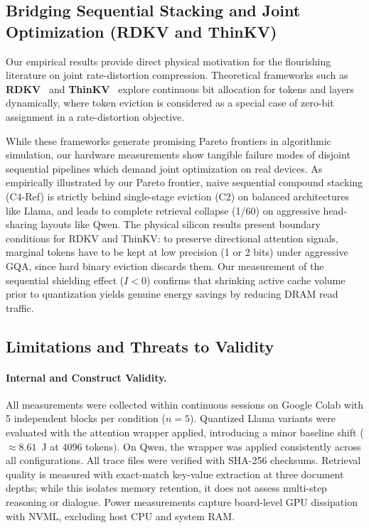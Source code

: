 \documentclass[sigconf,nonacm]{acmart}
\begin{document}
\subsection{Bridging Sequential Stacking and Joint Optimization (RDKV and ThinKV)}
\label{sec:joint-opt}
Our empirical results provide direct physical motivation for the flourishing literature on joint rate-distortion compression. Theoretical frameworks such as \textbf{RDKV}~\cite{zhang_rdkv_2026} and \textbf{ThinKV}~\cite{ramachandran_thinkv_2026} explore continuous bit allocation for tokens and layers dynamically, where token eviction is considered as a special case of zero-bit assignment in a rate-distortion objective.

While these frameworks generate promising Pareto frontiers in algorithmic simulation, our hardware measurements show tangible failure modes of disjoint sequential pipelines which demand joint optimization on real devices. As empirically illustrated by our Pareto frontier, naive sequential compound stacking (C4-Ref) is strictly behind single-stage eviction (C2) on balanced architectures like Llama, and leads to complete retrieval collapse (1/60) on aggressive head-sharing layouts like Qwen. The physical silicon results present boundary conditions for RDKV and ThinKV: to preserve directional attention signals, marginal tokens have to be kept at low precision (1 or 2 bits) under aggressive GQA, since hard binary eviction discards them. Our measurement of the sequential shielding effect ($I < 0$) confirms that shrinking active cache volume prior to quantization yields genuine energy savings by reducing DRAM read traffic.

\subsection{Limitations and Threats to Validity}
\paragraph{Internal and Construct Validity.} All measurements were collected within continuous sessions on Google Colab with 5 independent blocks per condition ($n=5$). Quantized Llama variants were evaluated with the attention wrapper applied, introducing a minor baseline shift ($\approx 8.61$~J at 4096 tokens). On Qwen, the wrapper was applied consistently across all configurations. All trace files were verified with SHA-256 checksums. Retrieval quality is measured with exact-match key-value extraction at three document depths; while this isolates memory retention, it does not assess multi-step reasoning or dialogue. Power measurements capture board-level GPU dissipation with NVML, excluding host CPU and system RAM.
\end{document}
